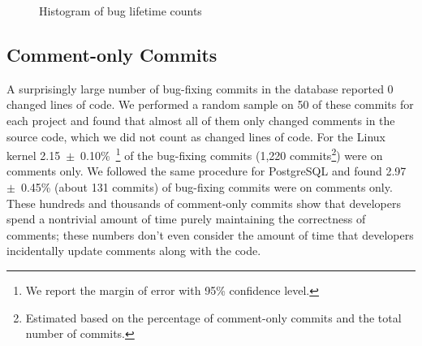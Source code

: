 \begin{figure}[tbh]
\centering
{}
\caption{\label{fig-bug-lifetime}Histogram of bug lifetime counts}
\end{figure}

\subsection{Comment-only Commits}
\label{sec-comment-only}
A surprisingly large number of bug-fixing commits in the database
reported 0 changed lines of code. We performed a random sample on 50 of these
commits for each project and found that almost all of them only changed comments in the
source code, which we did not count as changed lines of code. For the Linux kernel 
2.15~$\pm$~0.10\%~\footnote{We report
the margin of error with 95\% confidence level.} 
of the bug-fixing
commits (1,220 commits\footnote{Estimated based on the percentage of comment-only
commits and the total number of commits.}) were on comments only. We followed the same procedure for
PostgreSQL and found 2.97~$\pm$~0.45\% (about 131 commits) of bug-fixing commits were on
comments only.
These hundreds and thousands of comment-only commits show that developers spend a nontrivial amount of time purely maintaining
the correctness of comments; these numbers don't even consider the amount of
time that developers incidentally update comments along with the code.


